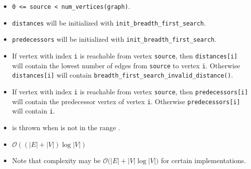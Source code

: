 \begin{itemdescr}
\preconditions
            \begin{itemize}
                  \item
                        \lstinline{0 <= source < num_vertices(graph)}. 
                  \item
                        \lstinline{distances} will be initialized with \lstinline{init_breadth_first_search}.
                  \item
                        \lstinline{predecessors} will be initialized with \lstinline{init_breadth_first_search}.
            \end{itemize}
      \pnum\effects
            \begin{itemize}
                  \item
                        If vertex with index \lstinline{i} is reachable from vertex \lstinline{source}, then
                        \lstinline{distances[i]} will contain the lowest number of edges from \lstinline{source} to vertex
                        \lstinline{i}.  Otherwise \lstinline{distances[i]} will contain
                        \lstinline{breadth_first_search_invalid_distance()}.
                  \item
                        If vertex with index \lstinline{i} is reachable
                        from vertex \lstinline{source}, then \lstinline{predecessors[i]} will contain the
                        predecessor vertex of vertex \lstinline{i}. Otherwise \lstinline{predecessors[i]} will contain
                        \lstinline{i}.
            \end{itemize}
      \pnum\throws
            \begin{itemize}
                  \item {} is thrown when  is not in the range .
            \end{itemize}
      \pnum\complexity
            \begin{itemize}
                  \item $\mathcal{O}((|E| + |V|)\log{|V|})$
                  \item Note that complexity may be $\mathcal{O}(|E| + |V|\log{|V|)}$ for certain implementations. 
            \end{itemize}
\end{itemdescr}

